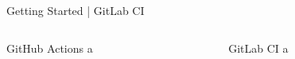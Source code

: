 \begin{frame}[fragile]{
    Getting Started | GitLab CI
    \hfill
  }
  \begin{columns}[t, onlytextwidth]
    \begin{column}{0.48\textwidth}
      \begin{block}{GitHub Actions}
         a
      \end{block}
    \end{column}
    \begin{column}{0.48\textwidth}
      \begin{block}{GitLab CI}
         a
      \end{block}
    \end{column}
  \end{columns}
\end{frame}

